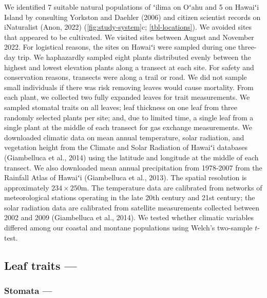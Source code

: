 \documentclass[
  letterpaper,
  DIV=11,
  numbers=noendperiod]{scrartcl}
\begin{document}
We identified 7 suitable natural populations of ʻilima on Oʻahu and 5 on
Hawaiʻi Island by consulting Yorkston and Daehler (2006) and citizen
scientist records on iNaturalist (Anon, 2022)
(\autoref{fig:study-system}c; \autoref{tbl-locations}). We avoided sites
that appeared to be cultivated. We visited sites between August and
November 2022. For logistical reasons, the sites on Hawaiʻi were sampled
during one three-day trip. We haphazardly sampled eight plants
distributed evenly between the highest and lowest elevation plants along
a transect at each site. For safety and conservation reasons, transects
were along a trail or road. We did not sample small individuals if there
was risk removing leaves would cause mortality. From each plant, we
collected two fully expanded leaves for trait measurements. We sampled
stomatal traits on all leaves; leaf thickness on one leaf from three
randomly selected plants per site; and, due to limited time, a single
leaf from a single plant at the middle of each transect for gas exchange
measurements. We downloaded climatic data on mean annual temperature,
solar radiation, and vegetation height from the Climate and Solar
Radiation of Hawaiʻi databases (Giambelluca et al., 2014) using the
latitude and longitude at the middle of each transect. We also
downloaded mean annual precipitation from 1978-2007 from the Rainfall
Atlas of Hawaiʻi (Giambelluca et al., 2013). The spatial resolution is
approximately \(234 \times 250\)m. The temperature data are calibrated
from networks of meteorological stations operating in the late 20th
century and 21st century; the solar radiation data are calibrated from
satellite measurements collected between 2002 and 2009 (Giambelluca et
al., 2014). We tested whether climatic variables differed among our
coastal and montane populations using Welch's two-sample \(t\)-test.

\hypertarget{leaf-traits}{%
\subsection{Leaf traits ---}\label{leaf-traits}}

\hypertarget{stomata}{%
\subsubsection{Stomata ---}\label{stomata}}
\end{document}
